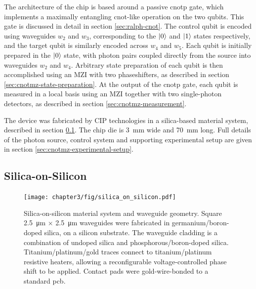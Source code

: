 The architecture of the chip is based around a passive \gls{cnotp} gate, which implements a maximally entangling \gls{cnot}-like operation on the two qubits. This gate is discussed in detail in section \ref{sec:ralph-cnot}. The control qubit is encoded using waveguides $w_2$ and $w_3$, corresponding to the $\mbox{$ | 0 \rangle $}$ and $\mbox{$ | 1 \rangle $}$ states respectively, and the target qubit is similarly encoded across $w_4$ and $w_5$. Each qubit is initially prepared in the $\mbox{$ | 0 \rangle $}$ state, with photon pairs coupled directly from the source into waveguides $w_2$ and $w_4$. Arbitrary state preparation of each qubit is then accomplished using an MZI with two phaseshifters, as described in section \ref{sec:cnotmz-state-preparation}. At the output of the \gls{cnotp} gate, each qubit is measured in a local basis using an MZI together with two single-photon detectors, as described in section \ref{sec:cnotmz-measurement}.

The device was fabricated by CIP technologies \cite{CIP} in a silica-based material system, described in section \ref{sec:silica-on-silicon}. The chip die is \SI{3}{\milli \metre} wide and \SI{70}{\milli \metre} long. Full details of the photon source, control system and supporting experimental setup are given in section \ref{sec:cnotmz-experimental-setup}.

\subsection{Silica-on-Silicon} 
\label{sec:silica-on-silicon}
\begin{figure}[t!]
\centering
\texttt{[image: chapter3/fig/silica\_on\_silicon.pdf]}
\caption[Silica on silicon]
{Silica-on-silicon material system and waveguide geometry. Square \SI{2.5}{\micro\metre} $\times$ \SI{2.5}{\micro\metre} waveguides were fabricated in germanium/boron-doped silica, on a silicon substrate. The waveguide cladding is a combination of undoped silica and phosphorous/boron-doped silica. Titanium/platinum/gold traces connect to titanium/platinum resistive heaters, allowing a reconfigurable voltage-controlled phase shift to be applied. Contact pads were gold-wire-bonded to a standard \gls{pcb}.}
\label{fig:silica-on-silicon}
\end{figure}

